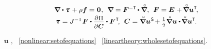 \nopagebreak\vspace{-0.25em}\begin{equation}\label{nonlinear:setofequations}
\begin{array}{c}
\boldnabla \dotp \cauchystress \hspace{.15ex} + \rho \bm{f} = \hspace{.1ex} \bm{0} \hspace{.1ex},
\:\:
\boldnabla = \bm{F}^{-\T} \hspace{-0.2ex} \dotp \boldnablacircled ,
\:\:
\bm{F} = \UnitDyad \hspace{.1ex} + \hspace{-0.2ex} \boldnablacircled {\bm{u}}^{\T} \hspace{-0.3ex},
\\[.2em]
%
\cauchystress \hspace{.1ex} = J^{-1} \hspace{.2ex} \bm{F} \dotp \scalebox{0.9}{$ \displaystyle \frac{\raisemath{-0.125em}{\partial\hspace{.1ex} \potential}}{\raisemath{-0.1em}{\partial\hspace{.1ex} \bm{C}}} $} \dotp \bm{F}^{\hspace{.1ex}\T} \hspace{-0.4ex},
\:\:
\bm{C} = \boldnablacircled {\bm{u}}^{\hspace{.1ex}\mathsf{S}} \hspace{-0.3ex} + \smalldisplaystyleonehalf \boldnablacircled \bm{u} \dotp \hspace{-0.25ex} \boldnablacircled \bm{u}^{\T} \hspace{-0.25ex}.
\end{array}
\end{equation}

\vspace{-0.1em}\noindent
{} ~$\bm{u}$ ,  ~\eqref{nonlinear:setofequations} ~\eqref{lineartheory:wholesetofequations}.

